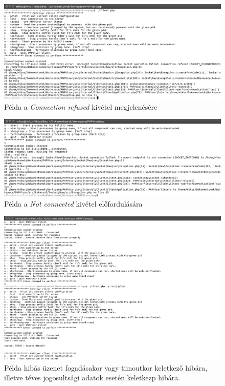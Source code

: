\documentclass[12pt]{report}
\begin{document}
 \begin{figure}[ht]
  \centering
  \includegraphics[width=15cm]{pics/connref.png}
	  \caption{Példa a \textit{Connection refused} kivétel megjelenésére }
      \label{fig:connref}
  \end{figure}

   \begin{figure}[ht]
  \centering
    \includegraphics[width=15cm]{pics/notconn.png}
	  \caption{Példa a \textit{Not connceted} kivétel előfordulására}
      \label{fig:notconn}
  \end{figure}
  
     \begin{figure}[ht]
  \centering
    \includegraphics[width=15cm]{pics/err.png}
	  \caption{Példa hibás üzenet fogadásakor vagy timoutkor keletkező hibára, illetve téves jogosultsági adatok esetén keletkezp hibára. }
      \label{fig:err}
  \end{figure}
  
\end{document}

